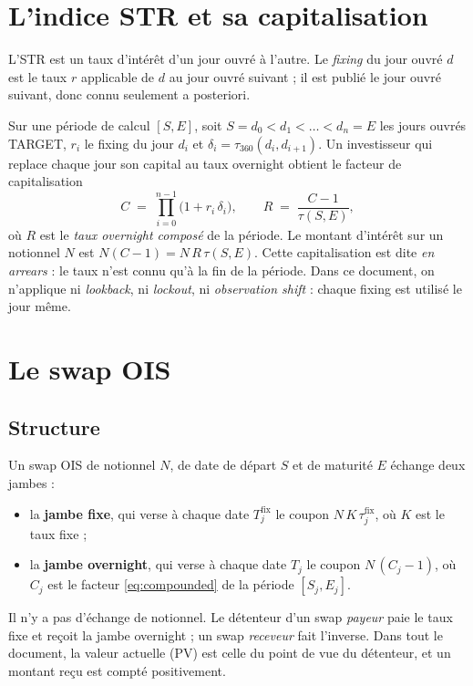 \documentclass[11pt,a4paper]{article}
\newcommand{\estr}{\texorpdfstring{\texteuro STR}{EUR STR}}
\theoremstyle{plain}
\theoremstyle{definition}
\theoremstyle{remark}
\begin{document}
\section{L'indice \estr{} et sa capitalisation}\label{sec:estr}

L'\estr{} est un taux d'intérêt d'un jour ouvré à l'autre. Le \emph{fixing} du jour ouvré $d$ est le
taux $r$ applicable de $d$ au jour ouvré suivant ; il est publié le jour ouvré suivant, donc connu
seulement a posteriori.

Sur une période de calcul $[S,E]$, soit $S=d_0<d_1<\dots<d_n=E$ les jours ouvrés TARGET, $r_i$ le
fixing du jour $d_i$ et $\delta_i=\tau_{360}(d_i,d_{i+1})$. Un investisseur qui replace chaque jour
son capital au taux overnight obtient le facteur de capitalisation
\begin{equation}
  C \;=\; \prod_{i=0}^{n-1}\bigl(1+r_i\,\delta_i\bigr),
  \qquad
  R \;=\; \frac{C-1}{\tau(S,E)},
  \label{eq:compounded}
\end{equation}
où $R$ est le \emph{taux overnight composé} de la période. Le montant d'intérêt sur un notionnel $N$
est $N(C-1)=N\,R\,\tau(S,E)$. Cette capitalisation est dite \emph{en arrears} : le taux n'est connu
qu'à la fin de la période. Dans ce document, on n'applique ni \emph{lookback}, ni \emph{lockout}, ni
\emph{observation shift} : chaque fixing est utilisé le jour même.

\section{Le swap OIS}\label{sec:swap}

\subsection{Structure}

Un swap OIS de notionnel $N$, de date de départ $S$ et de maturité $E$ échange deux jambes :
\begin{itemize}
  \item la \textbf{jambe fixe}, qui verse à chaque date $T^{\mathrm{fix}}_j$ le coupon
        $N\,K\,\tau^{\mathrm{fix}}_j$, où $K$ est le taux fixe ;
  \item la \textbf{jambe overnight}, qui verse à chaque date $T_j$ le coupon
        $N\,(C_j-1)$, où $C_j$ est le facteur \eqref{eq:compounded} de la période $[S_j,E_j]$.
\end{itemize}
Il n'y a pas d'échange de notionnel. Le détenteur d'un swap \emph{payeur} paie le taux fixe et reçoit
la jambe overnight ; un swap \emph{receveur} fait l'inverse. Dans tout le document, la valeur
actuelle (PV) est celle du point de vue du détenteur, et un montant reçu est compté positivement.
\end{document}
